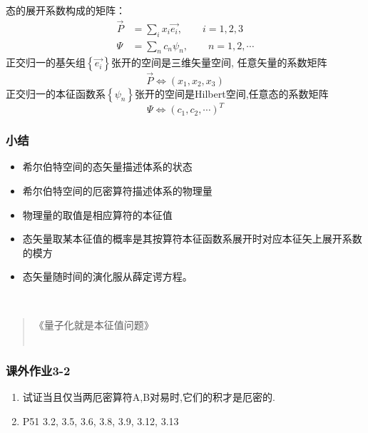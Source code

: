 \begin{frame} 
    态的展开系数构成的矩阵：\\ \vspace{0.3em}
    \begin{equation*}
        \begin{split}
            \vec{P}&=\sum_i{x_i\vec{e_i}}, \qquad i=1,2,3 \\
            \Psi&=\sum_n c_n \psi_n, \qquad n=1,2,\cdots 
        \end{split}  
    \end{equation*}
    正交归一的基矢组{$\left\{\vec{e_i}\right\}$}张开的空间是三维矢量空间, 任意矢量的系数矩阵 
    \[\vec{P}\Leftrightarrow(x_1,x_2,x_3)\]
    正交归一的本征函数系{$\left\{\psi_n\right\}$}张开的空间是Hilbert空间,任意态的系数矩阵 
    \[\Psi\Leftrightarrow(c_1,c_2,\cdots)^T\]
\end{frame} 

\begin{frame}
    \frametitle{小结}
   \begin{itemize}
       \item 希尔伯特空间的态矢量描述体系的状态
       \item 希尔伯特空间的厄密算符描述体系的物理量
       \item 物理量的取值是相应算符的本征值
       \item 态矢量取某本征值的概率是其按算符本征函数系展开时对应本征矢上展开系数的模方
       \item 态矢量随时间的演化服从薛定谔方程。
   \end{itemize}
   ~~ \\ \vspace{1.0em}
   \begin{quote}
    《量子化就是本征值问题》\\
    ~~\\
 \end{quote}
\end{frame} 

\begin{frame}
    \frametitle{课外作业3-2}
    \begin{enumerate}
        \item 试证当且仅当两厄密算符A,B对易时,它们的积才是厄密的.
        \item P51 3.2, 3.5, 3.6, 3.8, 3.9, 3.12, 3.13 
    \end{enumerate}
\end{frame}




